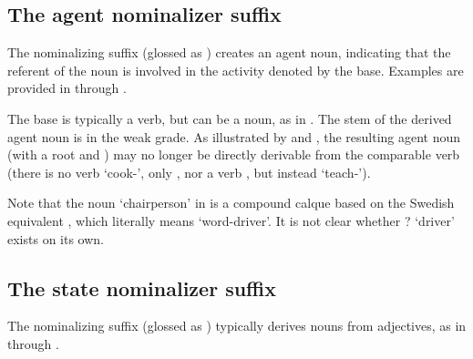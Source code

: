 \subsection{The agent nominalizer suffix }\label{agentNMLZ}
The nominalizing suffix  (glossed as ) creates an agent noun, indicating that the referent of the noun is involved in the activity denoted by the base. Examples are provided in  through . 
\ea\label{agentNMLZex1}
\z
\ea\label{agentNMLZex2}
\z
\ea\label{agentNMLZex3}
\z
\ea\label{agentNMLZex4}
\z
\ea\label{agentNMLZex5}
\z

The base is typically a verb, but can be a noun, as in . The stem of the derived agent noun is in the weak grade. 
As illustrated by  and , the resulting agent noun (with a root  and ) may no longer be directly derivable from the comparable verb (there is no verb  ‘cook-’, only , nor a verb , but instead  ‘teach-’). 

Note that the noun  ‘chairperson’ in  is a compound calque based on the Swedish equivalent , which literally means ‘word-driver’. It is not clear whether ? ‘driver’ exists on its own. 




\subsection{The state nominalizer suffix }\label{vuohta}
The nominalizing suffix  (glossed as ) typically derives nouns from adjectives, 
as in  through . 
\ea\label{vuohtaEx1}
\z
\ea\label{vuohtaEx2}
\z
\ea\label{vuohtaEx3}
\z

